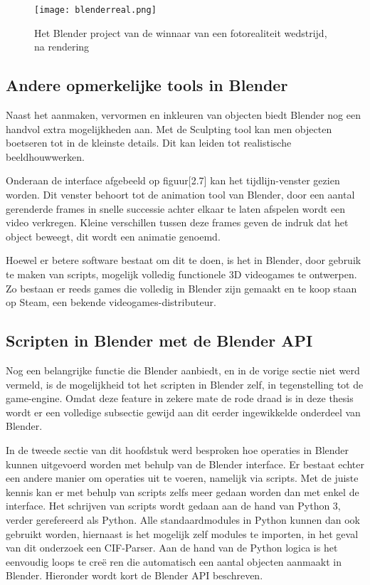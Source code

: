 \begin{figure}[h]
\texttt{[image: blenderreal.png]}
\caption{Het Blender project van de winnaar van een fotorealiteit wedstrijd, na rendering}
\end{figure}

\subsection{Andere opmerkelijke tools in Blender}
Naast het aanmaken, vervormen en inkleuren van objecten biedt Blender nog een handvol extra mogelijkheden aan. Met de Sculpting tool kan men objecten boetseren tot in de kleinste details. Dit kan leiden tot realistische beeldhouwwerken.

\par 
Onderaan de interface afgebeeld op figuur[2.7] kan het tijdlijn-venster gezien worden. Dit venster behoort tot de animation tool van Blender, door een aantal gerenderde frames in snelle successie achter elkaar te laten afspelen wordt een video verkregen. Kleine verschillen tussen deze frames geven de indruk dat het object beweegt, dit wordt een animatie genoemd. 

\par
Hoewel er betere software bestaat om dit te doen, is het in Blender, door gebruik te maken van scripts, mogelijk volledig functionele 3D videogames te ontwerpen. Zo bestaan er reeds games die volledig in Blender zijn gemaakt en te koop staan op Steam, een bekende videogames-distributeur.

\subsection{Scripten in Blender met de Blender API}
Nog een belangrijke functie die Blender aanbiedt, en in de vorige sectie niet werd vermeld, is de mogelijkheid tot het scripten in Blender zelf, in tegenstelling tot de game-engine. Omdat deze feature in zekere mate de rode draad is in deze thesis wordt er een volledige subsectie gewijd aan dit eerder ingewikkelde onderdeel van Blender.

\par
In de tweede sectie van dit hoofdstuk werd besproken hoe operaties in Blender kunnen uitgevoerd worden met behulp van de Blender interface. Er bestaat echter een andere manier om operaties uit te voeren, namelijk via scripts. Met de juiste kennis kan er met behulp van scripts zelfs meer gedaan worden dan met enkel de interface. 
Het schrijven van scripts wordt gedaan aan de hand van Python 3, verder gerefereerd als Python. Alle standaardmodules in Python kunnen dan ook gebruikt worden, hiernaast is het mogelijk zelf modules te importen, in het geval van dit onderzoek een CIF-Parser. Aan de hand van de Python logica is het eenvoudig loops te cre\"{e} ren die automatisch een aantal objecten aanmaakt in Blender. Hieronder wordt kort de Blender API beschreven.


